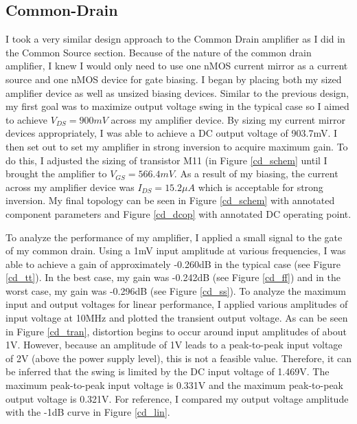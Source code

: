 \documentclass{article}
\begin{document}
\subsection{Common-Drain}
I took a very similar design approach to the Common Drain amplifier as I did in the Common Source section. Because of the nature of the common drain amplifier, I knew I would only need to use one nMOS current mirror as a current source and one nMOS device for gate biasing. I began by placing both my sized amplifier device as well as unsized biasing devices. Similar to the previous design, my first goal was to maximize output voltage swing in the typical case so I aimed to achieve $V_{DS} = 900mV$ across my amplifier device. By sizing my current mirror devices appropriately, I was able to achieve a DC output voltage of 903.7mV. I then set out to set my amplifier in strong inversion to acquire maximum gain. To do this, I adjusted the sizing of transistor M11 (in Figure \ref{cd_schem} until I brought the amplifier to $V_{GS} = 566.4mV$. As a result of my biasing, the current across my amplifier device was $I_{DS} = 15.2\mu A$ which is acceptable for strong inversion. My final topology can be seen in Figure \ref{cd_schem} with annotated component parameters and Figure \ref{cd_dcop} with annotated DC operating point.

To analyze the performance of my  amplifier, I applied a small signal to the gate of my common drain. Using a 1mV input amplitude at various frequencies, I was able to achieve a gain of approximately -0.260dB in the typical case (see Figure \ref{cd_tt}). In the best case, my gain was -0.242dB (see Figure \ref{cd_ff}) and in the worst case, my gain was -0.296dB (see Figure \ref{cd_ss}). To analyze the maximum input and output voltages for linear performance, I applied various amplitudes of input voltage at 10MHz and plotted the transient output voltage. As can be seen in Figure \ref{cd_tran}, distortion begins to occur around input amplitudes of about 1V. However, because an amplitude of 1V leads to a peak-to-peak input voltage of 2V (above the power supply level), this is not a feasible value. Therefore, it can be inferred that the swing is limited by the DC input voltage of 1.469V. The maximum peak-to-peak input voltage is 0.331V and the maximum peak-to-peak output voltage is 0.321V. For reference, I compared my output voltage amplitude with the -1dB curve in Figure \ref{cd_lin}.
\end{document}
